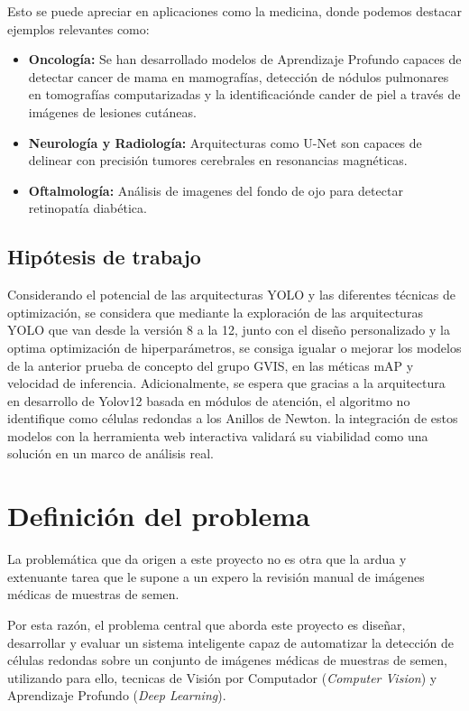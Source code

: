 \documentclass[12pt,a4paper,onecolumn,oneside]{report}
\begin{document}
Esto se puede apreciar en aplicaciones como la medicina, donde podemos destacar ejemplos relevantes como: 

\begin{itemize}
  \item \textbf{Oncología:} Se han desarrollado modelos de Aprendizaje Profundo capaces de detectar cancer de mama en mamografías, detección de nódulos pulmonares en tomografías computarizadas y la identificaciónde cander de piel a través de imágenes de lesiones cutáneas.
  \item \textbf{Neurología y Radiología:} Arquitecturas como U-Net son capaces de delinear con precisión tumores cerebrales en resonancias magnéticas.
  \item \textbf{Oftalmología:} Análisis de imagenes del fondo de ojo para detectar retinopatía diabética.
\end{itemize}

\subsection{Hipótesis de trabajo}

Considerando el potencial de las arquitecturas YOLO y las diferentes técnicas de optimización, se considera que mediante la exploración de las arquitecturas YOLO que van desde la versión 8 a la 12, 
junto con el diseño personalizado y la optima optimización de hiperparámetros, se consiga igualar o mejorar los modelos de la anterior prueba de concepto del grupo GVIS, en las méticas mAP y velocidad de inferencia. Adicionalmente, 
se espera que gracias a la arquitectura en desarrollo de Yolov12 basada en módulos de atención, el algoritmo no identifique como células redondas a los Anillos de Newton. la integración de estos modelos con la herramienta web interactiva
validará su viabilidad como una solución en un marco de análisis real.

\section{Definición del problema}
\label{sec:Definición del problema}

La problemática que da origen a este proyecto no es otra que la ardua y extenuante tarea que le supone a un expero la revisión manual de imágenes médicas de muestras de semen.

Por esta razón, el problema central que aborda este proyecto es diseñar, desarrollar y evaluar un sistema inteligente capaz de automatizar la detección de células 
redondas sobre un conjunto de imágenes médicas de muestras de semen, utilizando para ello, tecnicas de Visión por Computador (\textit{Computer Vision}) y Aprendizaje Profundo (\textit{Deep Learning}).
\end{document}
